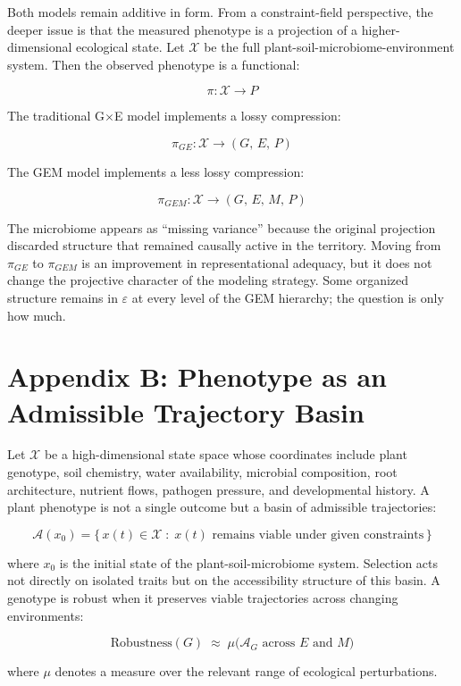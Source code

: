 \documentclass[11pt, a4paper]{article}
\begin{document}
Both models remain additive in form. From a constraint-field perspective, the deeper issue is that the measured phenotype is a projection of a higher-dimensional ecological state. Let $\mathcal{X}$ be the full plant-soil-microbiome-environment system. Then the observed phenotype is a functional:

\[
\pi : \mathcal{X} \to P
\]

The traditional G$\times$E model implements a lossy compression:

\[
\pi_{GE} : \mathcal{X} \to (G,\, E,\, P)
\]

The GEM model implements a less lossy compression:

\[
\pi_{GEM} : \mathcal{X} \to (G,\, E,\, M,\, P)
\]

The microbiome appears as ``missing variance'' because the original projection discarded structure that remained causally active in the territory. Moving from $\pi_{GE}$ to $\pi_{GEM}$ is an improvement in representational adequacy, but it does not change the projective character of the modeling strategy. Some organized structure remains in $\varepsilon$ at every level of the GEM hierarchy; the question is only how much.

\bigskip
{}
\section*{Appendix B: Phenotype as an Admissible Trajectory Basin}

Let $\mathcal{X}$ be a high-dimensional state space whose coordinates include plant genotype, soil chemistry, water availability, microbial composition, root architecture, nutrient flows, pathogen pressure, and developmental history. A plant phenotype is not a single outcome but a basin of admissible trajectories:

\[
\mathcal{A}(x_0) = \bigl\{\, x(t) \in \mathcal{X} \;:\; x(t) \text{ remains viable under given constraints}\,\bigr\}
\]

where $x_0$ is the initial state of the plant-soil-microbiome system. Selection acts not directly on isolated traits but on the accessibility structure of this basin. A genotype is robust when it preserves viable trajectories across changing environments:

\[
\mathrm{Robustness}(G) \;\approx\; \mu\!\bigl(\mathcal{A}_G \text{ across } E \text{ and } M\bigr)
\]

where $\mu$ denotes a measure over the relevant range of ecological perturbations.
\end{document}
